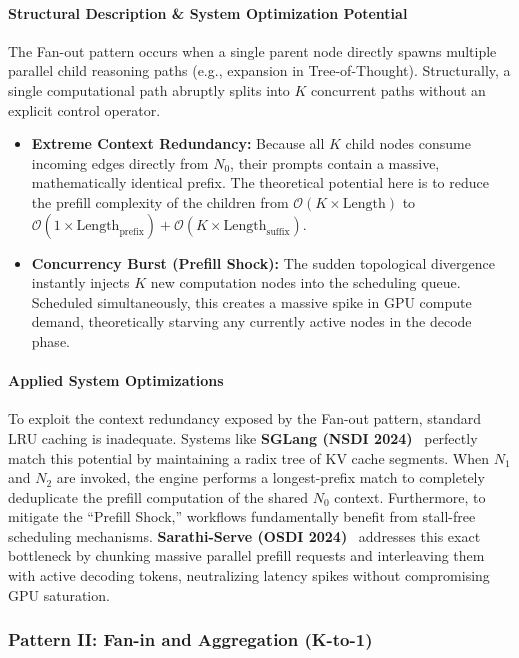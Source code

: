 \paragraph{Structural Description \& System Optimization Potential}
The Fan-out pattern occurs when a single parent node directly spawns multiple parallel child reasoning paths (e.g., expansion in Tree-of-Thought). Structurally, a single computational path abruptly splits into $K$ concurrent paths without an explicit control operator.
\begin{itemize}
    \item \textbf{Extreme Context Redundancy:} Because all $K$ child nodes consume incoming edges directly from $N_0$, their prompts contain a massive, mathematically identical prefix. The theoretical potential here is to reduce the prefill complexity of the children from $\mathcal{O}(K \times \text{Length})$ to $\mathcal{O}(1 \times \text{Length}_{\text{prefix}}) + \mathcal{O}(K \times \text{Length}_{\text{suffix}})$.
    \item \textbf{Concurrency Burst (Prefill Shock):} The sudden topological divergence instantly injects $K$ new computation nodes into the scheduling queue. Scheduled simultaneously, this creates a massive spike in GPU compute demand, theoretically starving any currently active nodes in the decode phase.
\end{itemize}

\paragraph{Applied System Optimizations}
To exploit the context redundancy exposed by the Fan-out pattern, standard LRU caching is inadequate. Systems like \textbf{SGLang (NSDI 2024)}~\citep{zheng2024sglang} perfectly match this potential by maintaining a radix tree of KV cache segments. When $N_1$ and $N_2$ are invoked, the engine performs a longest-prefix match to completely deduplicate the prefill computation of the shared $N_0$ context. Furthermore, to mitigate the ``Prefill Shock,'' workflows fundamentally benefit from stall-free scheduling mechanisms. \textbf{Sarathi-Serve (OSDI 2024)}~\citep{agrawal2024taming} addresses this exact bottleneck by chunking massive parallel prefill requests and interleaving them with active decoding tokens, neutralizing latency spikes without compromising GPU saturation.

\subsubsection{Pattern II: Fan-in and Aggregation (K-to-1)}

